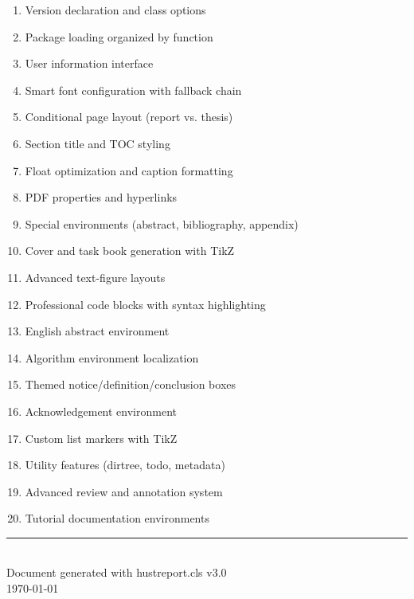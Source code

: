 \documentclass[linux]{hustreport}
\begin{document}
\begin{enumerate}
    \item Version declaration and class options
    \item Package loading organized by function
    \item User information interface
    \item Smart font configuration with fallback chain
    \item Conditional page layout (report vs. thesis)
    \item Section title and TOC styling
    \item Float optimization and caption formatting
    \item PDF properties and hyperlinks
    \item Special environments (abstract, bibliography, appendix)
    \item Cover and task book generation with TikZ
    \item Advanced text-figure layouts
    \item Professional code blocks with syntax highlighting
    \item English abstract environment
    \item Algorithm environment localization
    \item Themed notice/definition/conclusion boxes
    \item Acknowledgement environment
    \item Custom list markers with TikZ
    \item Utility features (dirtree, todo, metadata)
    \item Advanced review and annotation system
    \item Tutorial documentation environments
\end{enumerate}

\vspace{2cm}
\begin{center}
    \rule{0.4\textwidth}{0.5pt}\\[5pt]
    {\small Document generated with hustreport.cls v3.0}\\
    {\small \today}
\end{center}
\end{document}
